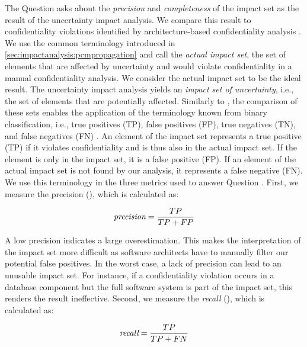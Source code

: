 \label{gqm:text:q:5:1}
The Question  asks about the \emph{precision} and \emph{completeness} of the impact set as the result of the uncertainty impact analysis.
We compare this result to confidentiality violations identified by architecture-based confidentiality analysis \cite{seifermann_detecting_2022,boltz_extensible_2024}.
We use the common terminology \cite{rostami_architecture-based_2017} introduced in \autoref{sec:impactanalysis:pcmpropagation} and call the \emph{actual impact set}, the set of elements that are affected by uncertainty and would violate confidentiality in a manual confidentiality analysis.
We consider the actual impact set to be the ideal result.
The uncertainty impact analysis yields an \emph{impact set of uncertainty}, i.e., the set of elements that are potentially affected.
Similarly to , the comparison of these sets enables the application of the terminology known from binary classification, i.e., true positives (TP), false positives (FP), true negatives (TN), and false negatives (FN) \cite{powers_evaluation_2011,van_rijsbergen_information_1979}.
An element of the impact set represents a true positive (TP) if it violates confidentiality and is thus also in the actual impact set.
If the element is only in the impact set, it is a false positive (FP).
If an element of the actual impact set is not found by our analysis, it represents a false negative (FN).
We use this terminology in the three metrics used to answer Question .
First, we measure the precision (\label{gqm:text:m:5:1:1}), which is calculated as:

\begin{equation*}
  \emph{precision} = \frac{TP}{TP + FP}
\end{equation*}

A low precision indicates a large overestimation.
This makes the interpretation of the impact set more difficult as software architects have to manually filter our potential false positives.
In the worst case, a lack of precision can lead to an unusable impact set.
For instance, if a confidentiality violation occurs in a database component but the full software system is part of the impact set, this renders the result ineffective.
Second, we measure the \emph{recall} (\label{gqm:text:m:5:1:2}), which is calculated as:

\begin{equation*}
  \emph{recall} = \frac{TP}{TP + FN}
\end{equation*}

